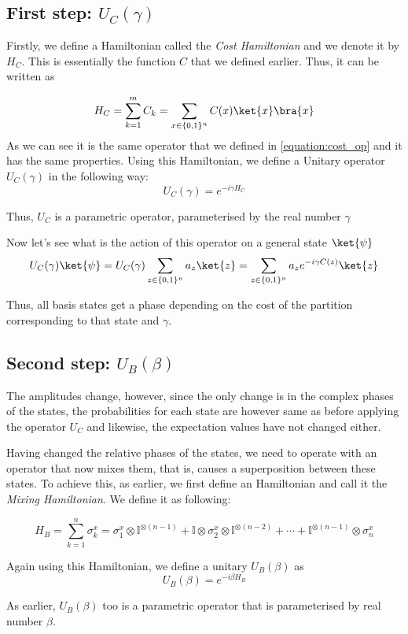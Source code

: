 \subsection{First step: $U_C(\gamma)$}
Firstly, we define a Hamiltonian called the \textit{Cost Hamiltonian} and we denote it by $H_C$.
This is essentially the function $C$ that we defined earlier.
Thus, it can be written as

\[
    H_C = \sum_{k=1}^m C_k = \sum_{x \in \{0, 1\}^n}C(x)\ket{x}\bra{x}
\]
As we can see it is the same operator that we defined in \ref{equation:cost_op} and it has the same properties.
Using this Hamiltonian, we define a Unitary operator $U_C(\gamma)$ in the following way:
$$U_C(\gamma) = e^{-i \gamma H_C}$$

Thus, $U_C$ is a parametric operator, parameterised by the real number $\gamma$

Now let's see what is the action of this operator on a general state $\ket{\psi}$
\[
    U_C(\gamma)\ket{\psi}= U_C(\gamma)\sum_{z \in\{0,1\}^n} a_z\ket{z} = \sum_{z \in\{0,1\}^n} a_z e^{-i\gamma C(z)} \ket{z}
\]

Thus, all basis states get a phase depending on the cost of the partition corresponding to that state and $\gamma$.
\subsection{Second step: $U_B(\beta)$}
The amplitudes change, however, since the only change is in the complex phases of the states, the probabilities for each state are however same as before applying the operator $U_C$ and likewise, the expectation values have not changed either.

Having changed the relative phases of the states, we need to operate with an operator that now mixes them, that is, causes a superposition between these states.
To achieve this, as earlier, we first define an Hamiltonian and call it the \textit{Mixing Hamiltonian}.
We define it as following:

\[
    H_B=\sum_{k=1}^n\sigma_k^x= \sigma_1^x\otimes \mathbb{I}^{\otimes(n-1)} + \mathbb{I} \otimes \sigma_2^x \otimes \mathbb{I}^{ \otimes(n-2)}+ \cdots + \mathbb{I}^{\otimes(n-1)} \otimes \sigma_n^x
\]

Again using this Hamiltonian, we define a unitary $U_B(\beta)$ as
$$U_B(\beta)= e^{-i\beta H_B}$$

As earlier, $U_B(\beta)$ too is a parametric operator that is parameterised by real number $\beta$.

